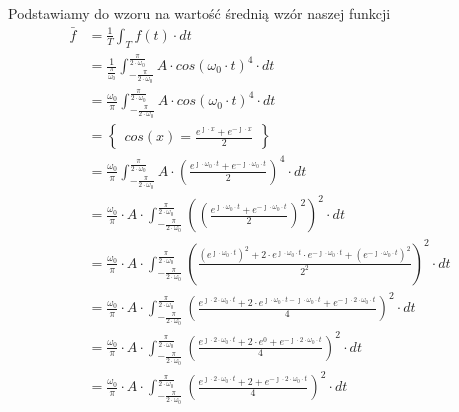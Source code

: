 \begin{task}
Podstawiamy do wzoru na wartość średnią wzór naszej funkcji
\begin{align*}
\bar{f} &=\frac{1}{T}\int_{T}^{} f(t) \cdot dt\\
&=\frac{1}{\frac{\pi}{\omega_0}}\int_{-\frac{\pi}{2\cdot\omega_0}}^{\frac{\pi}{2\cdot\omega_0}} A \cdot cos\left(\omega_0 \cdot t\right)^4 \cdot dt\\
&=\frac{\omega_0}{\pi}\int_{-\frac{\pi}{2\cdot\omega_0}}^{\frac{\pi}{2\cdot\omega_0}} A \cdot cos\left(\omega_0 \cdot t\right)^4 \cdot dt\\
&=\begin{Bmatrix}cos(x)=\frac{e^{\jmath \cdot x}+e^{-\jmath \cdot x}}{2}\end{Bmatrix}\\
&=\frac{\omega_0}{\pi}\int_{-\frac{\pi}{2\cdot\omega_0}}^{\frac{\pi}{2\cdot\omega_0}} A \cdot \left( \frac{e^{\jmath \cdot \omega_0 \cdot t}+e^{-\jmath \cdot \omega_0 \cdot t}}{2} \right)^4 \cdot dt\\
&=\frac{\omega_0}{\pi} \cdot A \cdot \int_{-\frac{\pi}{2\cdot\omega_0}}^{\frac{\pi}{2\cdot\omega_0}} \left( \left( \frac{e^{\jmath \cdot \omega_0 \cdot t}+e^{-\jmath \cdot \omega_0 \cdot t}}{2} \right)^2\right)^2 \cdot dt\\
&=\frac{\omega_0}{\pi} \cdot A \cdot \int_{-\frac{\pi}{2\cdot\omega_0}}^{\frac{\pi}{2\cdot\omega_0}} \left(  \frac{\left(e^{\jmath \cdot \omega_0 \cdot t}\right)^2+2\cdot e^{\jmath \cdot \omega_0 \cdot t} \cdot e^{-\jmath \cdot \omega_0 \cdot t} + \left(e^{-\jmath \cdot \omega_0 \cdot t}\right)^2}{2^2} \right)^2 \cdot dt\\
&=\frac{\omega_0}{\pi} \cdot A \cdot \int_{-\frac{\pi}{2\cdot\omega_0}}^{\frac{\pi}{2\cdot\omega_0}} \left(  \frac{e^{\jmath \cdot 2 \cdot \omega_0 \cdot t}+2\cdot e^{\jmath \cdot \omega_0 \cdot t -\jmath \cdot \omega_0 \cdot t} + e^{-\jmath \cdot 2 \cdot \omega_0 \cdot t}}{4} \right)^2 \cdot dt\\
&=\frac{\omega_0}{\pi} \cdot A \cdot \int_{-\frac{\pi}{2\cdot\omega_0}}^{\frac{\pi}{2\cdot\omega_0}} \left(  \frac{e^{\jmath \cdot 2 \cdot \omega_0 \cdot t}+2\cdot e^{0} + e^{-\jmath \cdot 2 \cdot \omega_0 \cdot t}}{4} \right)^2 \cdot dt\\
&=\frac{\omega_0}{\pi} \cdot A \cdot \int_{-\frac{\pi}{2\cdot\omega_0}}^{\frac{\pi}{2\cdot\omega_0}} \left(  \frac{e^{\jmath \cdot 2 \cdot \omega_0 \cdot t}+2 + e^{-\jmath \cdot 2 \cdot \omega_0 \cdot t}}{4} \right)^2 \cdot dt\\

\end{align*}
\end{task}
